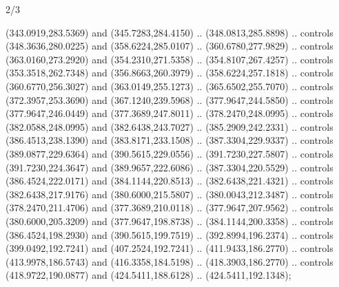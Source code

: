 \begin{flagdescription}{2/3}
\begin{scope}[shift={(0.5\flaglength,0.5\flagwidth)},scale=\flagwidth/481.3]
\begin{scope}[y=-0.8pt, x=0.8pt,shift={(-424,-300)}]
  (343.0919,283.5369) and (345.7283,284.4150) .. (348.0813,285.8898) .. controls
  (348.3636,280.0225) and (358.6224,285.0107) .. (360.6780,277.9829) .. controls
  (363.0160,273.2920) and (354.2310,271.5358) .. (354.8107,267.4257) .. controls
  (353.3518,262.7348) and (356.8663,260.3979) .. (358.6224,257.1818) .. controls
  (360.6770,256.3027) and (363.0149,255.1273) .. (365.6502,255.7070) .. controls
  (372.3957,253.3690) and (367.1240,239.5968) .. (377.9647,244.5850) .. controls
  (377.9647,246.0449) and (377.3689,247.8011) .. (378.2470,248.0995) .. controls
  (382.0588,248.0995) and (382.6438,243.7027) .. (385.2909,242.2331) .. controls
  (386.4513,238.1390) and (383.8171,233.1508) .. (387.3304,229.9337) .. controls
  (389.0877,229.6364) and (390.5615,229.0556) .. (391.7230,227.5807) .. controls
  (391.7230,224.3647) and (389.9657,222.6086) .. (387.3304,220.5529) .. controls
  (386.4524,222.0171) and (384.1144,220.8513) .. (382.6438,221.4321) .. controls
  (382.6438,217.9176) and (380.6000,215.5807) .. (380.0043,212.3487) .. controls
  (378.2470,211.4706) and (377.3689,210.0118) .. (377.9647,207.9562) .. controls
  (380.6000,205.3209) and (377.9647,198.8738) .. (384.1144,200.3358) .. controls
  (386.4524,198.2930) and (390.5615,199.7519) .. (392.8994,196.2374) .. controls
  (399.0492,192.7241) and (407.2524,192.7241) .. (411.9433,186.2770) .. controls
  (413.9978,186.5743) and (416.3358,184.5198) .. (418.3903,186.2770) .. controls
  (418.9722,190.0877) and (424.5411,188.6128) .. (424.5411,192.1348);
\end{scope}
\end{scope}
\framecode{}
\end{flagdescription}
